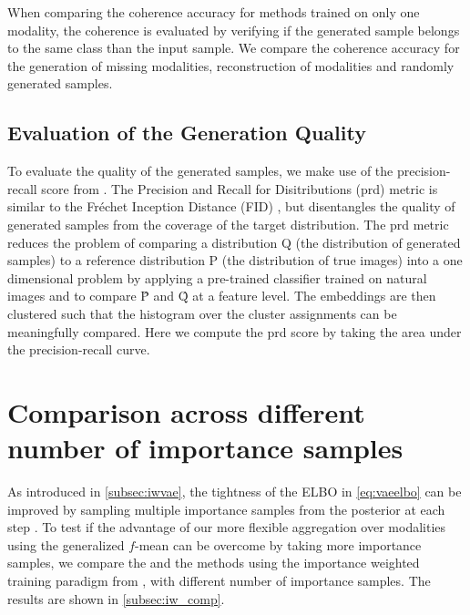 When comparing the coherence accuracy for methods trained on only one modality, the coherence is evaluated by verifying if the generated sample belongs to the same class than the input sample.
We compare the coherence accuracy for the generation of missing modalities, reconstruction of modalities and randomly generated samples.

\subsection{Evaluation of the Generation Quality}
\label{subsubsec:gen_qual}
To evaluate the quality of the generated samples, we make use of the precision-recall score from \citep{precision_recall_distributions}.
The Precision and Recall for Disitributions (prd) metric is similar to the Fréchet Inception Distance (FID) \citep{heusel_gans_2017}, but disentangles the quality of generated samples from the coverage of the target distribution.
The prd metric reduces the problem of comparing a distribution Q (the distribution of generated samples) to a reference distribution P (the distribution of true images) into a one dimensional problem by applying a pre-trained classifier trained on natural images and to compare \^{P} and \^{Q} at a feature level.
The embeddings are then clustered such that the histogram over the cluster assignments can be meaningfully compared.
Here we compute the prd score by taking the area under the precision-recall curve.



\section{Comparison across different number of importance samples}
As introduced in \cref{subsec:iwvae}, the tightness of the ELBO in \cref{eq:vaeelbo} can be improved by sampling multiple importance samples from the posterior at each step \parencite{burda_importance_2016}.
To test if the advantage of our more flexible aggregation over modalities using the generalized $f$-mean can be overcome by taking more importance samples, we compare the  and the  methods using the importance weighted training paradigm from \parencite{burda_importance_2016}, with different number of importance samples.
The results are shown in \cref{subsec:iw_comp}.

